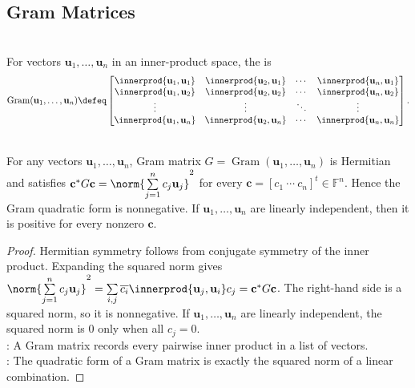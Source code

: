 \subsection{Gram Matrices}

\begin{definition} \label{def:gram-matrix} \\
For vectors $\mathbf{u}_1,\ldots,\mathbf{u}_n$ in an inner-product space, the  is
\begin{align}
\operatorname{Gram}(\mathbf{u}_1,\ldots,\mathbf{u}_n)
\defeq
\begin{bmatrix}
\innerprod{\mathbf{u}_1,\mathbf{u}_1} & \innerprod{\mathbf{u}_2,\mathbf{u}_1} & \cdots & \innerprod{\mathbf{u}_n,\mathbf{u}_1}\\
\innerprod{\mathbf{u}_1,\mathbf{u}_2} & \innerprod{\mathbf{u}_2,\mathbf{u}_2} & \cdots & \innerprod{\mathbf{u}_n,\mathbf{u}_2}\\
\vdots & \vdots & \ddots & \vdots\\
\innerprod{\mathbf{u}_1,\mathbf{u}_n} & \innerprod{\mathbf{u}_2,\mathbf{u}_n} & \cdots & \innerprod{\mathbf{u}_n,\mathbf{u}_n}
\end{bmatrix}.
\nonumber
\end{align}
\end{definition}

\begin{proposition} \label{prop:gram-matrix-positive-semidefinite} \\
For any vectors $\mathbf{u}_1,\ldots,\mathbf{u}_n$, Gram matrix $G=\operatorname{Gram}(\mathbf{u}_1,\ldots,\mathbf{u}_n)$ is Hermitian and satisfies $\mathbf{c}^*G\mathbf{c} =\norm{\sum\limits_{j=1}^{n}c_j\mathbf{u}_j}^2$ for every $\mathbf{c}=[c_1\ \cdots\ c_n]^t\in\mathbb{F}^n$. Hence the Gram quadratic form is nonnegative. If $\mathbf{u}_1,\ldots,\mathbf{u}_n$ are linearly independent, then it is positive for every nonzero $\mathbf{c}$.
\begin{proof}
Hermitian symmetry follows from conjugate symmetry of the inner product. Expanding the squared norm gives $\norm{\sum\limits_{j=1}^{n}c_j\mathbf{u}_j}^2 =\sum\limits_{i,j}\overline{c_i}\innerprod{\mathbf{u}_j,\mathbf{u}_i}c_j =\mathbf{c}^*G\mathbf{c}$.
The right-hand side is a squared norm, so it is nonnegative. If $\mathbf{u}_1,\ldots,\mathbf{u}_n$ are linearly independent, the squared norm is $0$ only when all $c_j=0$.\\
: A Gram matrix records every pairwise inner product in a list of vectors.\\
: The quadratic form of a Gram matrix is exactly the squared norm of a linear combination.
\end{proof}
\end{proposition}
